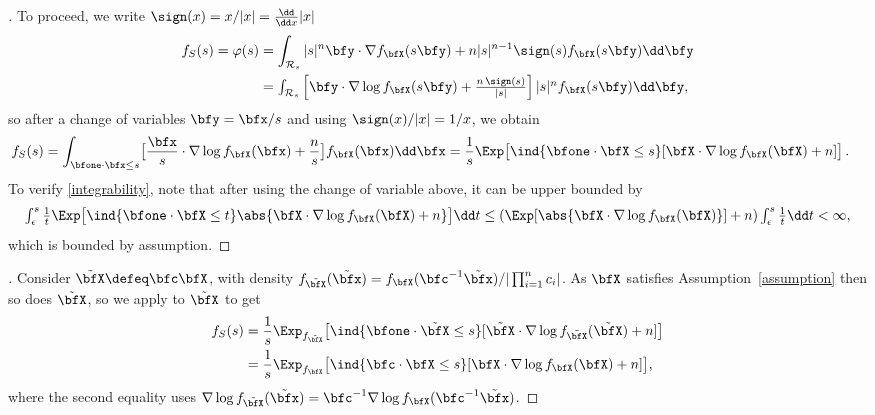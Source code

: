 \begin{subappendices}
\begin{proof}[]
To proceed, we write $\sign(x)= x / |x| = \frac{\dd}{\dd x} |x|$
\begin{align*}
f_S(s)=\varphi(s) &=\int_{\mathcal{R}_s} |s|^n \bfy \cdot \nabla f_{\bfX}(s \bfy) + n |s|^{n-1} \sign(s) f_{\bfX}(s \bfy)  \dd \bfy \\
&=\textstyle\int_{\mathcal{R}_s} \left[ \bfy \cdot \nabla \log f_{\bfX}(s \bfy) + \frac{n \, \sign(s)}{|s|} \right] |s|^{n} f_{\bfX}(s \bfy)  \dd \bfy ,
\end{align*}
so after a change of variables $\bfy = \bfx / s$ and using $\sign(x)/|x|=1/x$, we obtain
\begin{align*}
f_S(s)
&= \int_{\bfone \cdot \bfx \le s } \bigl[ \frac{\bfx}{s} \cdot \nabla \log f_{\bfX}(\bfx) + \frac{n}{s} \bigr] f_{\bfX}(\bfx)  \dd \bfx
= \frac{1}{s} \Exp \bigl[ \ind{ \bfone \cdot \bfX \le s } [ \bfX \cdot \nabla \log f_{\bfX}(\bfX) + n ] \bigr] \,.
\end{align*}
To verify \eqref{integrability}, note that after using the change of variable above, it can be upper bounded by
\[
\textstyle\int_\epsilon^s\frac{1}{t} \Exp \bigl[ \ind{ \bfone \cdot \bfX \le t } \abs{ \bfX \cdot \nabla \log f_{\bfX}(\bfX) + n } \bigr] \dd t \leq (\Exp [ \abs{ \bfX \cdot \nabla \log f_{\bfX}(\bfX) } ] + n) \int_\epsilon^s\frac{1}{t}\dd t<\infty,
\]
which is bounded by assumption.
\end{proof}

\begin{proof}[]
Consider $\tilde{\bfX} \defeq \bfc \bfX$, with density
$f_{\tilde{\bfX}}(\tilde{\bfx}) = f_{\bfX}(\bfc^{-1} \tilde{\bfx} ) / | \prod_{i=1}^n c_i |$.
As $\bfX$ satisfies Assumption~\ref{assumption} then so does $\tilde{\bfX}$, so we apply  to $\tilde{\bfX}$ to get
\begin{align*}
f_S(s)
&= \frac{1}{s} \Exp_{f_{\tilde{\bfX}}}\bigl[ \ind{\bfone \cdot \tilde{\bfX} \le s} [ \tilde{\bfX} \cdot \nabla \log f_{\tilde{\bfX}}(\tilde{\bfX}) + n ] \bigr] \\
&= \frac{1}{s} \Exp_{f_{\bfX}}\bigl[ \ind{\bfc \cdot \bfX \le s} [ \bfX \cdot \nabla \log f_{\bfX}(\bfX) + n ] \bigr],
\end{align*}
where the second equality uses
$\nabla \log f_{\tilde{\bfX}}(\tilde{\bfx})
= \bfc^{-1} \nabla \log f_{\bfX}(\bfc^{-1} \tilde{\bfx} )  $.
\end{proof}


\end{subappendices}
